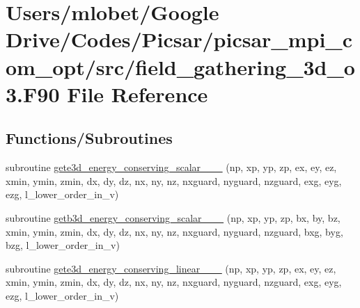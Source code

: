 \hypertarget{field__gathering__3d__o3_8_f90}{}\section{Users/mlobet/\+Google Drive/\+Codes/\+Picsar/picsar\+\_\+mpi\+\_\+com\+\_\+opt/src/field\+\_\+gathering\+\_\+3d\+\_\+o3.F90 File Reference}
\label{field__gathering__3d__o3_8_f90}
\subsection*{Functions/\+Subroutines}
\begin{DoxyCompactItemize}
\item 
subroutine \hyperlink{field__gathering__3d__o3_8_f90_aafcef6faa8aa6d61b950249a1285c258}{gete3d\+\_\+energy\+\_\+conserving\+\_\+scalar\+\_\+\_\+\_} (np, xp, yp, zp, ex, ey, ez, xmin, ymin, zmin,                                                                                                                                                           dx, dy, dz, nx, ny, nz, nxguard, nyguard, nzguard,                                                                                                                                                   exg, eyg, ezg, l\+\_\+lower\+\_\+order\+\_\+in\+\_\+v)
\item 
subroutine \hyperlink{field__gathering__3d__o3_8_f90_a521bd3732f843934943ef8a923d5da72}{getb3d\+\_\+energy\+\_\+conserving\+\_\+scalar\+\_\+\_\+\_} (np, xp, yp, zp, bx, by, bz, xmin, ymin, zmin,                                                                                                                                                           dx, dy, dz, nx, ny, nz, nxguard, nyguard, nzguard,                                                                                                                                                   bxg, byg, bzg, l\+\_\+lower\+\_\+order\+\_\+in\+\_\+v)
\item 
subroutine \hyperlink{field__gathering__3d__o3_8_f90_ae26c3ade4bf6bf1835b6f0ddae56ff5d}{gete3d\+\_\+energy\+\_\+conserving\+\_\+linear\+\_\+\_\+\_} (np, xp, yp, zp, ex, ey, ez, xmin, ymin, zmin,                                                                                                                                                           dx, dy, dz, nx, ny, nz, nxguard, nyguard, nzguard,                                                                                                                                                   exg, eyg, ezg, l\+\_\+lower\+\_\+order\+\_\+in\+\_\+v)

\end{DoxyCompactItemize}
